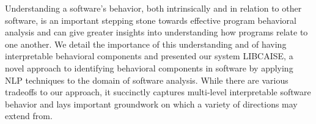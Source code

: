 Understanding a software's behavior, both intrinsically and in relation to other software, is an important stepping stone towards effective program behavioral analysis and can give greater insights into understanding how programs relate to one another. We detail the importance of this understanding and of having interpretable behavioral components and presented our system LIBCAISE, a novel approach to identifying behavioral components in software by applying NLP techniques to the domain of software analysis. While there are various tradeoffs to our approach, it succinctly captures multi-level interpretable software behavior and lays important groundwork on which a variety of directions may extend from.